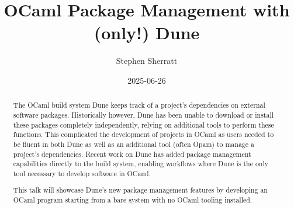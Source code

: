 \documentclass{article}
\title{\bf OCaml Package Management with (only!) Dune}
\date{2025-06-26}
\author[1]{Stephen Sherratt}
\affil[1]{Tarides}
\begin{document}
    \maketitle

    \begin{abstract}
        The OCaml build system Dune keeps track of a project's dependencies on
        external software packages. Historically however, Dune has been unable
        to download or install these packages completely independently, relying
        on additional tools to perform these functions. This complicated the
        development of projects in OCaml as users needed to be fluent in both
        Dune as well as an additional tool (often Opam) to manage a project's
        dependencies. Recent work on Dune has added package management
        capabilities directly to the build system, enabling workflows where Dune
        is the only tool necessary to develop software in OCaml.

        This talk will showcase Dune's new package management features by
        developing an OCaml program starting from a bare system with no OCaml
        tooling installed.
    \end{abstract}
\end{document}
